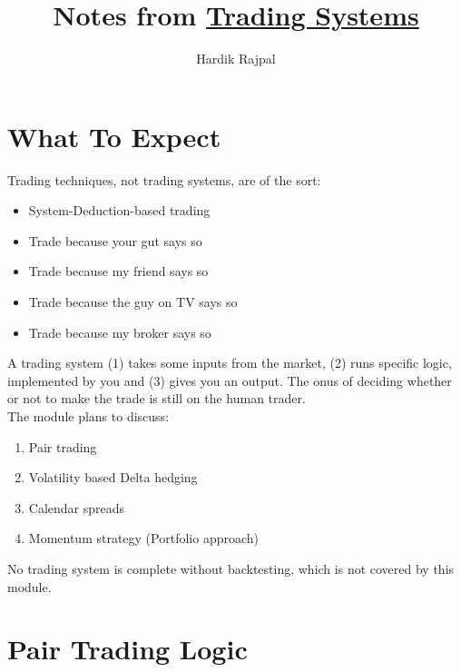 \documentclass{article}
\author{Hardik Rajpal}
\title{Notes from \href{https://zerodha.com/varsity/chapter/what-to-expect/}{Trading Systems}}
\begin{document}
\maketitle
\section{What To Expect}
Trading techniques, not trading systems, are of the sort:
\begin{itemize}
    \item System-Deduction-based trading
    \item Trade because your gut says so
    \item Trade because my friend says so
    \item Trade because the guy on TV says so
    \item Trade because my broker says so
\end{itemize}
A trading system (1) takes some inputs from the market, (2) runs specific logic, implemented
by you and (3) gives you an output. The onus of deciding whether or not to make
the trade is still on the human trader.\\
The module plans to discuss:
\begin{enumerate}
    \item Pair trading
    \item Volatility based Delta hedging
    \item Calendar spreads
    \item Momentum strategy (Portfolio approach)
\end{enumerate}
No trading system is complete without backtesting, which is not covered by this module.
\section{Pair Trading Logic}
\end{document}
